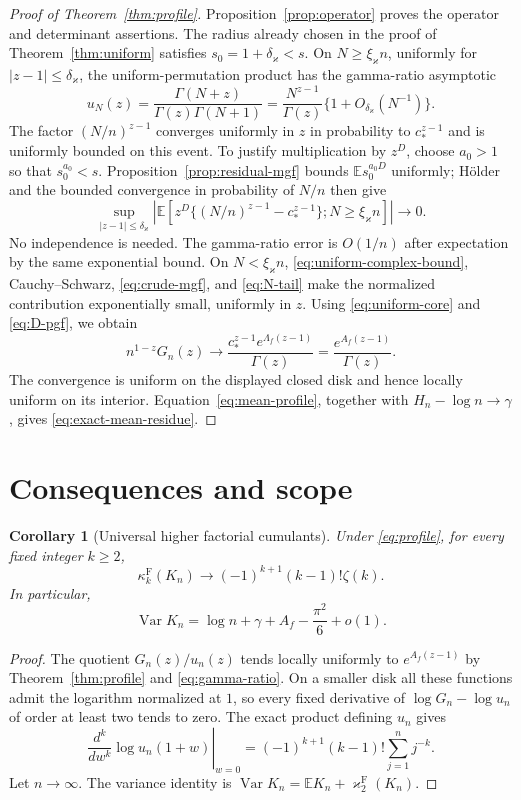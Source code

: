 \documentclass[11pt]{article}
\numberwithin{equation}{section}
\newtheorem{corollary}[theorem]{Corollary}
\theoremstyle{definition}
\theoremstyle{remark}
\newcommand{\E}{\mathbb E}
\newcommand{\Var}{\operatorname{Var}}
\newcommand{\abs}[1]{\left|#1\right|}
\begin{document}
\begin{proof}[Proof of Theorem~\ref{thm:profile}]
Proposition~\ref{prop:operator} proves the operator and determinant assertions. The radius already chosen in the proof of Theorem~\ref{thm:uniform} satisfies $s_0=1+\delta_\varkappa<s$. On $N\ge\xi_{\varkappa}n$, uniformly for $|z-1|\le\delta_\varkappa$, the uniform-permutation product has the gamma-ratio asymptotic \cite[Section 5.11(iii)]{DLMF}
\begin{equation}\label{eq:gamma-ratio}
 u_N(z)=\frac{\Gamma(N+z)}{\Gamma(z)\Gamma(N+1)}
       =\frac{N^{z-1}}{\Gamma(z)}\{1+O_{\delta_\varkappa}(N^{-1})\}.
\end{equation}
The factor $(N/n)^{z-1}$ converges uniformly in $z$ in probability to $c_*^{z-1}$ and is uniformly bounded on this event. To justify multiplication by $z^D$, choose $a_0>1$ so that $s_0^{a_0}<s$. Proposition~\ref{prop:residual-mgf} bounds $\E s_0^{a_0D}$ uniformly; H\"older and the bounded convergence in probability of $N/n$ then give
\[
 \sup_{|z-1|\le\delta_\varkappa}
 \abs{\E\left[z^D\{(N/n)^{z-1}-c_*^{z-1}\};N\ge\xi_{\varkappa}n\right]}
 \longrightarrow0.
\]
No independence is needed. The gamma-ratio error is $O(1/n)$ after expectation by the same exponential bound. On $N<\xi_{\varkappa}n$, \eqref{eq:uniform-complex-bound}, Cauchy--Schwarz, \eqref{eq:crude-mgf}, and \eqref{eq:N-tail} make the normalized contribution exponentially small, uniformly in $z$.
Using \eqref{eq:uniform-core} and \eqref{eq:D-pgf}, we obtain
\[
 n^{1-z}G_n(z)\longrightarrow
 \frac{c_*^{z-1}e^{\Lambda_f(z-1)}}{\Gamma(z)}
 =\frac{e^{A_f(z-1)}}{\Gamma(z)}.
\]
The convergence is uniform on the displayed closed disk and hence locally uniform on its interior. Equation~\eqref{eq:mean-profile}, together with $H_n-\log n\to\gamma$, gives \eqref{eq:exact-mean-residue}.
\end{proof}

\section{Consequences and scope}\label{sec:consequences}

\begin{corollary}[Universal higher factorial cumulants]\label{cor:limiting-cumulants}
Under \eqref{eq:profile}, for every fixed integer $k\ge2$,
\begin{equation}\label{eq:limiting-cumulants}
 \kappa_k^{\mathrm F}(K_n)\longrightarrow
 (-1)^{k+1}(k-1)!\zeta(k).
\end{equation}
In particular,
\[
 \Var K_n=\log n+\gamma+A_f-\frac{\pi^2}{6}+o(1).
\]
\end{corollary}
\begin{proof}
The quotient $G_n(z)/u_n(z)$ tends locally uniformly to $e^{A_f(z-1)}$ by Theorem~\ref{thm:profile} and \eqref{eq:gamma-ratio}. On a smaller disk all these functions admit the logarithm normalized at $1$, so every fixed derivative of $\log G_n-\log u_n$ of order at least two tends to zero. The exact product defining $u_n$ gives
\[
 \left.\frac{d^k}{dw^k}\log u_n(1+w)\right|_{w=0}
 =(-1)^{k+1}(k-1)!\sum_{j=1}^n j^{-k}.
\]
Let $n\to\infty$. The variance identity is $\Var K_n=\E K_n+\varkappa_2^{\mathrm F}(K_n)$.
\end{proof}
\end{document}
